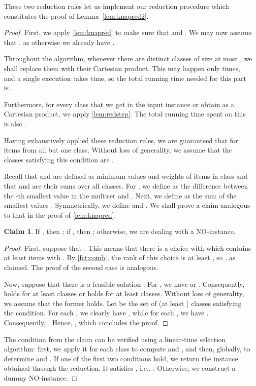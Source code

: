 \documentclass{article}
\theoremstyle{plain}
\theoremstyle{definition}
\newtheorem*{claim}{Claim}
\begin{document}
   These two reduction rules let us implement our reduction procedure which constitutes the proof of Lemma~\ref{lem:knapred2}.
    \begin{proof}
    First, we apply \cref{lem:knapred} to make sure that  and .
    We may now assume that , as otherwise we already have .
     
    Throughout the algorithm, whenever there are distinct classes of size at most , 
    we shall replace them with their Cartesian product.
    This may happen only  times, and a single execution takes  time,
    so the total running time needed for this part is .
    
    Furthermore, for every class that we get in the input instance or obtain as a Cartesian product,
    we apply \cref{lem:redstep}.  The total running time spent on this is also .
    
    Having exhaustively applied these reduction rules, we are guaranteed that
     for items  from all but one class. 
    Without loss of generality, we assume that the classes satisfying this condition are .
    
    Recall that  and  are defined as minimum values and weights of items in class 
    and that  and  are their sums over all classes.
    For , we define  as the difference between the 
    -th smallest value in the multiset   and .
    Next, we define  as the sum of the  smallest values .
    Symmetrically, we define  and .
    We shall prove a claim analogous to that in the proof of \cref{lem:knapred}.
    
    \begin{claim}
    If , then ; if , then ;  otherwise, we are dealing with a NO-instance. 
    \end{claim}
    \begin{proof}
    First, suppose that .
    This means that there is a choice  with  
    which contains at least  items  with . 
    By \cref{fct:comb}, the rank of this choice is at least , so , as claimed.
    The proof of the second case is analogous.
    
    Now, suppose that there is a feasible solution . For , we have 
    or . Consequently,  holds for at least 
    classes or  holds for at least  classes.
    Without loss of generality, we assume that the former holds. Let  be the set of (at least ) classes  satisfying the condition.
    For each , we clearly have , while for each , we have .
    Consequently, .
    Hence, , which concludes the proof.
    \end{proof}
       
    The condition from the claim can be verified using a linear-time selection algorithm: 
    first, we apply it for each class to compute  and , 
    and then, globally, to determine  and .
    If one of the first two conditions hold, we return the instance obtained through the reduction.
    It satisfies , i.e., .
    Otherwise, we construct a dummy NO-instance.
    \end{proof}
\end{document}
